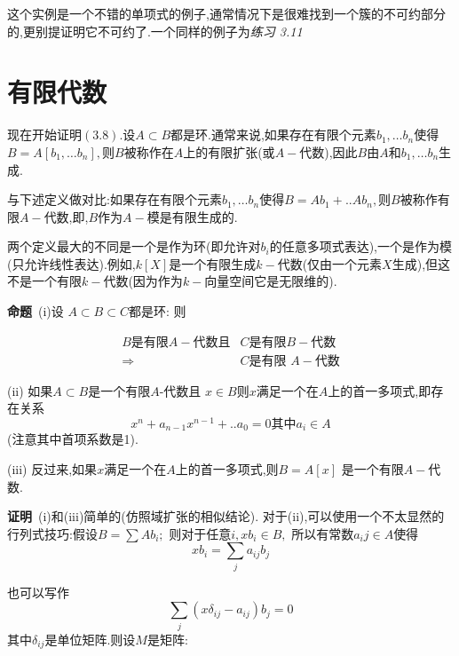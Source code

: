 \documentclass[UTF8]{book}
\begin{document}
		
		这个实例是一个不错的单项式的例子,通常情况下是很难找到一个簇的不可约部分的,更别提证明它不可约了.一个同样的例子为\textit{练习 3.11}
		
		
	\section{有限代数}
		现在开始证明$ (3.8) $.设$A \subset B$都是环.通常来说,如果存在有限个元素$b_{1}, \dots b_{n}$使得$B=A\left[b_{1}, \ldots b_{n}\right],$则$ B $被称作在$ A $上的有限扩张(或$ A- $代数),因此$ B$由$ A $和$b_{1}, \ldots b_{n}$生成.
		
		
		与下述定义做对比:如果存在有限个元素$b_{1}, \dots b_{n}$使得$B=A b_{1}+. . A b_{n},$则$ B $被称作有限$ A- $代数,即,$ B $作为$ A- $模是有限生成的.
		
		
		两个定义最大的不同是一个是作为环(即允许对$ b_{i} $的任意多项式表达),一个是作为模(只允许线性表达).例如,$ k[X] $是一个有限生成$ k- $代数(仅由一个元素$ X $生成),但这不是一个有限$ k- $代数(因为作为$ k- $向量空间它是无限维的).
		
		
		\textbf{命题}\  (i)设 $A \subset B \subset C$都是环: 则
		
		\begin{equation*}
		\begin{split}
		B\text{是有限} A -\text{代数且}&C \text{是有限} B -\text{代数}\\
		\Rightarrow &C \text {是有限 }A -\text{代数}
		\end{split}
		\end{equation*}
		
		
		(ii) 如果$A \subset B$是一个有限$ A $-代数且 $x \in B$则$x$满足一个在$A$上的首一多项式,即存在关系
		\begin{equation*}
		x^{n}+a_{n-1} x^{n-1}+. . a_{0}=0 \text {其中}a_{i} \in A
		\end{equation*}
		(注意其中首项系数是1).
		
		
		(iii) 反过来,如果$x$满足一个在$A$上的首一多项式,则$B=A[x]$ 是一个有限$ A- $代数.
		
		
		\textbf{证明}\  (i)和(iii)简单的(仿照域扩张的相似结论). 对于(ii),可以使用一个不太显然的行列式技巧:假设$B =\sum A b _{ i } ;$ 则对于任意$i ,  x b_{ i } \in B ,$ 所以有常数$a_ij \in A$使得
		\begin{equation*}
		x b_{i}=\sum_{j} a_{i j} b_{j}
		\end{equation*}
		
		
		也可以写作
		\begin{equation*}
		\sum_{j}\left(x \delta_{i j}-a_{i j}\right) b_{j}=0
		\end{equation*}
		其中$\delta_{ ij }$是单位矩阵.则设$M$是矩阵:
		
\end{document}
